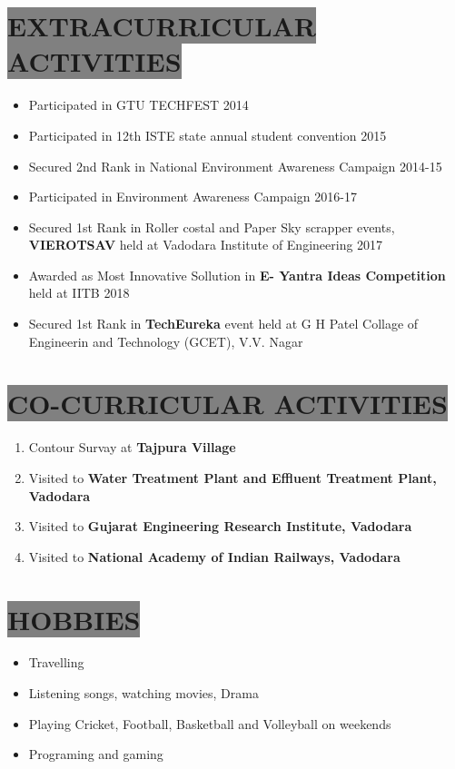 \documentclass{res} %
\begin{document}
\begin{resume}
\section{
\colorbox{grey}{EXTRACURRICULAR ACTIVITIES}          
}
\begin{itemize} 
 \item Participated in GTU TECHFEST 2014
 \item Participated in 12th ISTE state annual student convention 2015
 \item Secured 2nd Rank in National Environment Awareness Campaign 2014-15
 \item Participated in Environment Awareness Campaign 2016-17
 \item Secured 1st Rank in Roller costal and Paper Sky scrapper events, \textbf{VIEROTSAV} held at Vadodara Institute of Engineering 2017
 \item Awarded as Most Innovative Sollution in \textbf{E- Yantra Ideas Competition} held at IITB 2018
 \item Secured 1st Rank in \textbf{TechEureka} event held at G H Patel Collage of Engineerin and Technology (GCET), V.V. Nagar
 \end{itemize}


\section{
\colorbox{grey}{CO-CURRICULAR ACTIVITIES} 
}         
\begin{enumerate} 
 \item Contour Survay at \textbf{Tajpura Village}
 \item Visited to \textbf{ Water Treatment Plant and Effluent Treatment Plant, Vadodara}
\item Visited to \textbf{ Gujarat Engineering Research Institute, Vadodara}
\item Visited to \textbf{ National Academy of Indian Railways, Vadodara }
 \end{enumerate}


\section{
\colorbox{grey}{HOBBIES}
}
\begin{itemize}
\item Travelling
\item Listening songs, watching movies, Drama
\item Playing Cricket, Football, Basketball and Volleyball on weekends
\item Programing and gaming
\end{itemize}



\end{resume}
\end{document}
